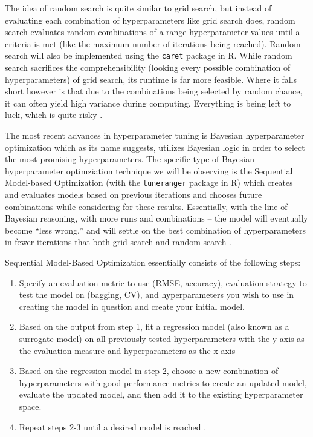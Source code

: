 \documentclass[12pt]{article}
\begin{document}
The idea of random search is quite similar to grid search, but instead
of evaluating each combination of hyperparameters like grid search does,
random search evaluates random combinations of a range hyperparameter
values until a criteria is met (like the maximum number of iterations
being reached). Random search will also be implemented using the
\texttt{caret} package in R. While random search sacrifices the
comprehensibility (looking every possible combination of
hyperparameters) of grid search, its runtime is far more feasible. Where
it falls short however is that due to the combinations being selected by
random chance, it can often yield high variance during computing.
Everything is being left to luck, which is quite risky
\citep{Bergstra2012}.

The most recent advances in hyperparameter tuning is Bayesian
hyperparameter optimization which as its name suggests, utilizes
Bayesian logic in order to select the most promising hyperparameters.
The specific type of Bayesian hyperparameter optimziation technique we
will be observing is the Sequential Model-based Optimization (with the
\texttt{tuneranger} package in R) which creates and evaluates models
based on previous iterations and chooses future combinations while
considering for these results. Essentially, with the line of Bayesian
reasoning, with more runs and combinations -- the model will eventually
become ``less wrong,'' and will settle on the best combination of
hyperparameters in fewer iterations that both grid search and random
search \citep{Probst2019}.

Sequential Model-Based Optimization essentially consists of the
following steps:

\begin{enumerate}
\def\labelenumi{\arabic{enumi})}
\item
  Specify an evaluation metric to use (RMSE, accuracy), evaluation
  strategy to test the model on (bagging, CV), and hyperparameters you
  wish to use in creating the model in question and create your initial
  model.
\item
  Based on the output from step 1, fit a regression model (also known as
  a surrogate model) on all previously tested hyperparameters with the
  y-axis as the evaluation measure and hyperparameters as the x-axis
\item
  Based on the regression model in step 2, choose a new combination of
  hyperparameters with good performance metrics to create an updated
  model, evaluate the updated model, and then add it to the existing
  hyperparameter space.
\item
  Repeat steps 2-3 until a desired model is reached \citep{Probst2019}.
\end{enumerate}
\end{document}
